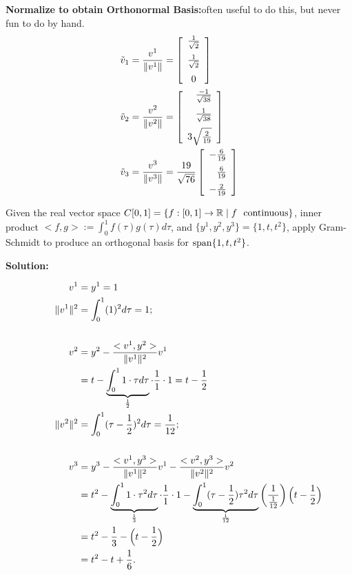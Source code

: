 \textbf{Normalize to obtain Orthonormal Basis:}often useful to do this, but never fun to do by hand.\\
	\begin{align*}
		\tilde{v}_1 &= \frac{v^1}{\| v^1 \|} = \left[ \begin{array}{c} \frac{1}{\sqrt{2}} \medskip \\ \frac{1}{\sqrt{2}} \medskip \\ 0 \end{array} \right]\\
		\tilde{v}_2 &= \frac{v^2}{\| v^2 \|} = \left[ \begin{array}{r} \frac{-1}{\sqrt{38}} \medskip \\ \frac{1}{\sqrt{38}} \medskip \\ 3\sqrt{\frac{2}{19}} \end{array} \right]\\
		\tilde{v}_3 &= \frac{v^3}{\| v^3 \|} = \frac{19}{\sqrt{76}} \left[ \begin{array}{r} -\frac{6}{19} \medskip \\ \frac{6}{19} \medskip \\ -\frac{2}{19}
			\end{array} \right]\\
	\end{align*}
\Qed

\begin{example} Given the real vector space $C[0,1] = \{ f:[0,1] \rightarrow \mathbb R \mid f~~\mbox{continuous} \}$, inner product $<f,g> := \int_0^1 f(\tau) g(\tau) d\tau$, and 
	$\{ y^1, y^2, y^3 \} = \{ 1, t, t^2 \}$, apply Gram-Schmidt to produce an orthogonal basis for $\mathrm{span} \{  1, t, t^2 \}$.

\end{example}

\textbf{Solution:}

	\begin{align*}
		v^1 &= y^1 = 1\\
		\qquad \| v^1 \|^2 &= \int_0^1 (1)^2 d\tau = 1 ;\\
		\\
		v^2	&= y^2 - \frac{<v^1,y^2>}{\| v^1 \|^2} v^1 \\
		&= t - \underbrace{%
			\int_0^1 1 \cdot \tau d\tau%
			}_{\frac{1}{2}} \cdot \frac{1}{1} \cdot 1
		= t - \frac{1}{2} \\
		\| v^2 \|^2 &= \int_0^1 (\tau - \frac{1}{2})^2 d\tau = \frac{1}{12} ;\\
		\\
		v^3	&= y^3 - \frac{<v^1,y^3>}{\| v^1 \|^2} v^1
		- \frac{<v^2,y^3>}{\| v^2 \|^2} v^2 \\
		&= t^2 - \underbrace{%
			\int_0^1 1 \cdot \tau^2 d\tau%
			}_{\frac{1}{3}} \cdot \frac{1}{1} \cdot 1
		- \underbrace{%
			\int_0^1 (\tau - \frac{1}{2}) \tau^2 d\tau%
			}_{\frac{1}{12}} \left( \frac{1}{\frac{1}{12}} \right)
				\Bigl( t - \frac{1}{2} \Bigr) \\
		&= t^2 - \frac{1}{3} - \Bigl( t - \frac{1}{2} \Bigr) \\
		&= t^2 - t + \frac{1}{6}.
	\end{align*}
	\Qed

